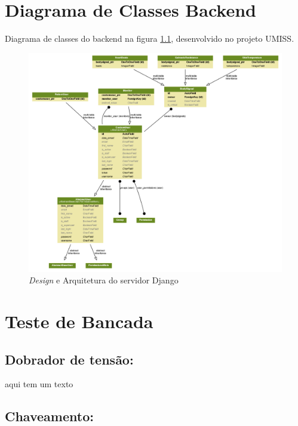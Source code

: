 \begin{anexosenv}

  \partanexos

  \chapter{Diagrama de Classes Backend}
  \label{anx:server_uml}
  Diagrama de classes do backend na figura \ref{fig:server_uml}, desenvolvido no projeto UMISS.
  \begin{figure}[!h]
    \centering
    \includegraphics[width=\textwidth, angle=90]{figuras/server_uml.png}
    \caption{\textit{Design} e Arquitetura do servidor Django}
    \label{fig:server_uml}
  \end{figure}

  \chapter{Teste de Bancada}

      \section{Dobrador de tensão:}

      aqui tem um texto

      \section{Chaveamento:}


\end{anexosenv}
